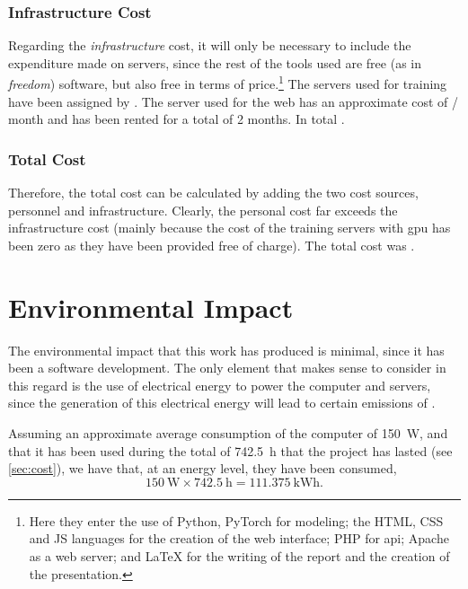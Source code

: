 \subsubsection{Infrastructure Cost}

Regarding the \emph{infrastructure} cost, it will only be necessary to include
the expenditure made on servers, since the rest of the tools used are free (as
in \emph{freedom}) software, but also free in terms of price.\footnote{Here
  they enter the use of Python, PyTorch for modeling; the HTML, CSS and JS
  languages for the creation of the web interface; PHP for \gls{api}; Apache as
  a web server; and \LaTeX{} for the writing of the report and the creation of
  the presentation.} The servers used for training have been assigned by
. The server used for the
web has an approximate cost of  / month and has been rented for a total
of 2 months. In total .

\subsubsection{Total Cost}

Therefore, the total cost can be calculated by adding the two cost sources,
personnel and infrastructure. Clearly, the personal cost far exceeds the
infrastructure cost (mainly because the cost of the training servers with
\gls{gpu} has been zero as they have been provided free of charge). The total
cost was .



\section{Environmental Impact} \label{sec:enviromental}

The environmental impact that this work has produced is minimal, since it has
been a software development. The only element that makes sense to consider in
this regard is the use of electrical energy to power the computer and servers,
since the generation of this electrical energy will lead to certain emissions
of .

Assuming an approximate average consumption of the computer of \SI{150}{\watt},
and that it has been used during the total of \SI{742.5}{\hour} that the
project has lasted (see \vref{sec:cost}), we have that, at an energy level,
they have been consumed,
\begin{equation}
  \SI{150}{\watt} \times \SI{742.5}{\hour} = \SI{111.375}{\kWh}.
\end{equation}

